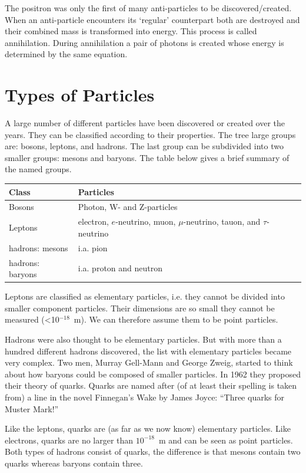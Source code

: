 \documentclass[12pt,a4paper]{article}
\numberwithin{equation}{section}
\numberwithin{figure}{section}
\numberwithin{table}{section}
\begin{document}
The positron was only the first of many anti-particles to be discovered/created. When an anti-particle encounters its `regular' counterpart both are destroyed and their combined mass is transformed into energy. This process is called annihilation. During annihilation a pair of photons is created whose energy is determined by the same equation.

\section{Types of Particles}
A large number of different  particles have been discovered or created over the years. They can be classified according to their properties. The tree large groups are: bosons, leptons, and hadrons. The last group can be subdivided into two smaller groups: mesons and baryons. The table below gives a brief summary of the named groups.

\begin{center}\begin{tabular}[h] {l l}
Class & Particles \\ \hline
Bosons & Photon, W- and Z-particles \\
Leptons & electron, $e$-neutrino, muon, $\mu$-neutrino, tauon, and $\tau$-neutrino \\
hadrons: mesons & i.a.  pion \\
hadrons: baryons & i.a. proton and neutron
\end{tabular}\end{center}
\label{tab:data_2}

\vspace{0.5cm}

Leptons are classified as elementary particles, i.e. they cannot be divided into smaller component particles. Their dimensions are so small they cannot be measured (\textless10$^{-18}$~m). We can therefore assume them to be point particles.

Hadrons were also thought to be elementary particles. But with more than a hundred different hadrons discovered, the list with elementary particles became very complex. Two men, Murray Gell-Mann and George Zweig, started to think about how baryons could be composed of smaller particles. In 1962 they proposed their theory of quarks. Quarks are named after (of at least their spelling is taken from) a line in the novel Finnegan's Wake by James Joyce: ``Three quarks for Muster Mark!''

Like the leptons, quarks are (as far as we now know) elementary particles. Like electrons, quarks are no larger than $10^{-18}$~m and can be seen as point particles. Both types of hadrons consist of quarks, the difference is that mesons contain two quarks whereas baryons contain three.
\end{document}
